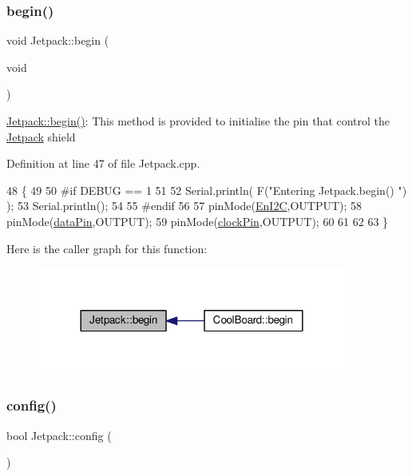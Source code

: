 \subsubsection{\texorpdfstring{begin()}{begin()}}
{\footnotesize\ttfamily void Jetpack\+::begin (\begin{DoxyParamCaption}\item[{void}]{ }\end{DoxyParamCaption})}

\hyperlink{class_jetpack_a5a53e1ebf7aaf3bf3e0d37ea64ca09a7}{Jetpack\+::begin()}\+: This method is provided to initialise the pin that control the \hyperlink{class_jetpack}{Jetpack} shield 

Definition at line 47 of file Jetpack.\+cpp.


\begin{DoxyCode}
48 \{
49 
50 \textcolor{preprocessor}{#if DEBUG == 1 }
51  
52     Serial.println( F(\textcolor{stringliteral}{"Entering Jetpack.begin() "}) );
53     Serial.println();
54 
55 \textcolor{preprocessor}{#endif}
56 
57     pinMode(\hyperlink{class_jetpack_a81df984fb4cea98c71aa1a1cfcdfe814}{EnI2C},OUTPUT);
58     pinMode(\hyperlink{class_jetpack_a3d669a56e93c71dd25f970d4ed7d0c00}{dataPin},OUTPUT);
59     pinMode(\hyperlink{class_jetpack_a58ebb991f358f3ae94e82148b0221b5a}{clockPin},OUTPUT);
60     
61     
62 
63 \}
\end{DoxyCode}
Here is the caller graph for this function\+:\nopagebreak
\begin{figure}[H]
\begin{center}
\leavevmode
\includegraphics[width=288pt]{df/d1d/class_jetpack_a5a53e1ebf7aaf3bf3e0d37ea64ca09a7_icgraph}
\end{center}
\end{figure}
\mbox{\label{class_jetpack_ab065ee83e244265a2223a22f3ee4a719}} 
\subsubsection{\texorpdfstring{config()}{config()}}
{\footnotesize\ttfamily bool Jetpack\+::config (\begin{DoxyParamCaption}{ }\end{DoxyParamCaption})}

